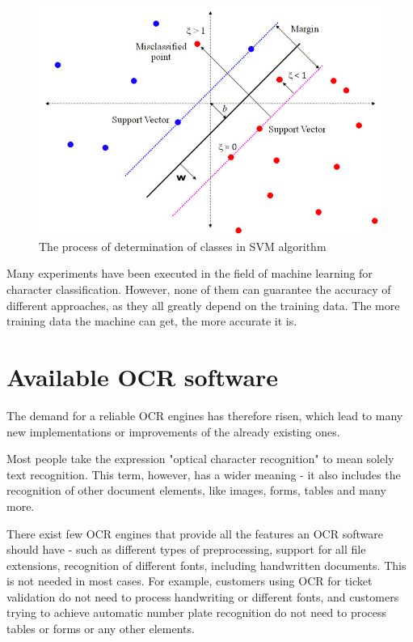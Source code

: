 \begin{figure}[H]
\centering
\includegraphics[width=0.7\linewidth]{img/characterClassification/svm.jpg}
\caption{The process of determination of classes in SVM algorithm \citep{svmAlgorithm}} \label{fig:1a}
\end{figure}

Many experiments have been executed in the field of machine learning for character classification. However, none of them can guarantee the accuracy of different approaches, as they all greatly depend on the training data. The more training data the machine can get, the more accurate it is. 

\section{Available OCR software}


 The demand for a reliable OCR engines has therefore risen, which lead to many new implementations or improvements of the already existing ones.

Most people take the expression "optical character recognition" to mean solely text recognition. This term, however, has a wider meaning - it also includes the recognition of other document elements, like images, forms, tables and many more.

There exist few OCR engines that provide all the features an OCR software should have - such as different types of preprocessing, support for all file extensions, recognition of different fonts, including handwritten documents. This is not needed in most cases. For example, customers using OCR for ticket validation do not need to process handwriting or different fonts, and customers trying to achieve automatic number plate recognition do not need to process tables or forms or any other elements.


